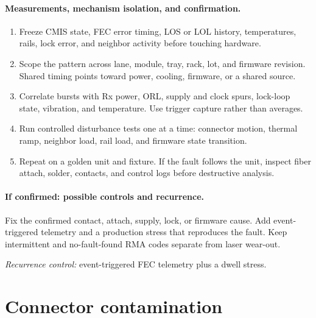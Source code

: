 
\paragraph{Measurements, mechanism isolation, and confirmation.}
\begin{enumerate}
\item Freeze CMIS state, FEC error timing, LOS or LOL history, temperatures,
      rails, lock error, and neighbor activity before touching hardware.
\item Scope the pattern across lane, module, tray, rack, lot, and firmware
      revision. Shared timing points toward power, cooling, firmware, or a shared
      source.
\item Correlate bursts with Rx power, ORL, supply and clock spurs, lock-loop
      state, vibration, and temperature. Use trigger capture rather than averages.
\item Run controlled disturbance tests one at a time: connector motion, thermal
      ramp, neighbor load, rail load, and firmware state transition.
\item Repeat on a golden unit and fixture. If the fault follows the unit, inspect
      fiber attach, solder, contacts, and control logs before destructive analysis.
\end{enumerate}

\paragraph{If confirmed: possible controls and recurrence.}
Fix the confirmed contact, attach, supply, lock, or firmware cause. Add
event-triggered telemetry and a production stress that reproduces the fault.
Keep intermittent and no-fault-found RMA codes separate from laser wear-out.


\emph{Recurrence control:} event-triggered FEC telemetry plus a dwell stress.

\section{Connector contamination}
\label{sec:fm-contamination}

